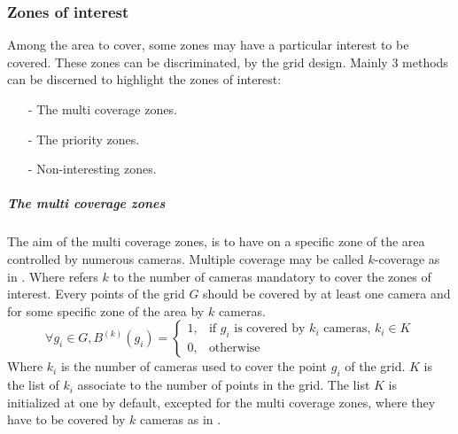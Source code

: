 \subsubsection{Zones of interest} \label{sec:zoneOfInterest}
Among the area to cover, some zones may have a particular interest to be covered. These zones can be discriminated, by the grid design. 
Mainly 3 methods can be discerned to highlight the zones of interest:
\begin{itemize}
	\item[-]	The multi coverage zones. 
	\item[-]	The priority zones.  
	\item[-]	Non-interesting zones.
\end{itemize}
 

\subparagraph{The multi coverage zones}
The aim of the multi coverage zones, is to have on a specific zone of the area controlled by numerous cameras.  Multiple coverage may be called $k$-coverage as in \cite{174*zhang2016}. Where refers $k$ to the number of cameras mandatory to cover the zones of interest. 
Every points of the grid $G$ should be covered by at least one camera and for some specific zone of the area by $k$ cameras.\\

\begin{equation}\label{eq:PciK}
\forall g_i \in G, B^{(k)}(g_i)= \begin{cases} 1, & \mbox{if } g_i\mbox{ is covered by $k_i$ cameras, } k_i \in K \\ 0, & \mbox{otherwise}   \end{cases}
\end{equation}
Where $k_i$ is the number of cameras used to cover the point $g_i$ of the grid. $K$ is the list of $k_i$ associate to the number of points in the grid. The list $K$ is initialized at one by default, excepted for the multi coverage zones,  where they have to be covered  by $k$ cameras as in \cite{82*chrysostomou2012}. 

